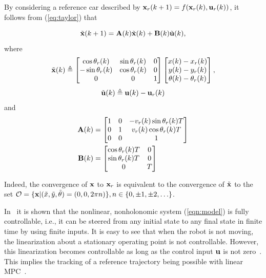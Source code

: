 \documentclass[conference]{IEEEtran} %
\begin{document}
By considering a reference car described by ${\bf x}_r(k+1)=f({\bf x}_r(k),{\bf u}_r(k))$, it follows from (\ref{eq:taylor}) that

\begin{equation}\label{eqn:error}
	\tilde{\bf x}(k+1) = {\bf A}(k)\tilde{\bf x}(k)+{\bf B}(k)\tilde{\bf u}(k),
\end{equation}
\noindent where
\begin{equation*}
	\tilde{\bf x}(k) \triangleq \begin{bmatrix}
		\cos\theta_r(k)  & \sin\theta_r(k) & 0 \\
		-\sin\theta_r(k) & \cos\theta_r(k) & 0 \\
		0		       & 0		     & 1
	\end{bmatrix} 
	\begin{bmatrix}
		x(k)-x_r(k) \\ y(k)-y_r(k) \\ \theta(k)-\theta_r(k)
	\end{bmatrix},
\end{equation*}
$$
\tilde{\bf u}(k)\triangleq{\bf u}(k)-{\bf u}_r(k)
$$
\noindent and
\begin{align*}
	{\bf A}(k) &= \begin{bmatrix}
		1 & 0 & -v_r(k)\sin\theta_r(k)T \\
		0 & 1 &  v_r(k)\cos\theta_r(k)T \\
		0 & 0 & 1
	\end{bmatrix} \\
	{\bf B}(k) &= \begin{bmatrix}
		\cos\theta_r(k)T & 0 \\
		\sin\theta_r(k)T & 0 \\
		0 			  & T
	\end{bmatrix}
\end{align*}

Indeed, the convergence of ${\bf x}$ to ${\bf x}_r$ is equivalent to the convergence of $\tilde{\bf x}$ to the set ${\cal O}=\{{\bf x}|(\tilde x,\tilde y,\tilde\theta)=(0,0,2\pi n)\},n\in \{0,\pm1,\pm2,\ldots\}$.

In~\cite{bloch89} it is shown that the nonlinear, nonholonomic system (\ref{eqn:model}) is fully controllable, i.e., it can be steered from any initial state to any final state in finite time by using finite inputs. It is easy to see that when the robot is not moving, the linearization about a stationary operating point is not controllable. However, this linearization becomes controllable as long as the control input ${\bf u}$ is not zero~\cite{samson91}. This implies the tracking of a reference trajectory being possible with linear MPC~\cite{essen01}.
\end{document}
